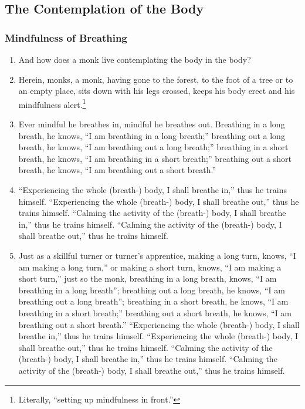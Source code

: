 \subsection*{The Contemplation of the Body}
\subsubsection*{Mindfulness of Breathing}
\begin{enumerate}[resume]
\item And how does a monk live contemplating the body in the body?
\item Herein, monks, a monk, having gone to the forest, to the foot of a tree or to an empty place, sits down with his legs crossed, keeps his body erect and his mindfulness alert.\footnote{Literally, “setting up mindfulness in front.”}
\item Ever mindful he breathes in, mindful he breathes out. Breathing in a long breath, he knows, “I am breathing in a long breath;” breathing out a long breath, he knows, “I am breathing out a long breath;” breathing in a short breath, he knows, “I am breathing in a short breath;” breathing out a short breath, he knows, “I am breathing out a short breath.”
\item “Experiencing the whole (breath-) body, I shall breathe in,” thus he trains himself. “Experiencing the whole (breath-) body, I shall breathe out,” thus he trains himself. “Calming the activity of the (breath-) body, I shall breathe in,” thus he trains himself. “Calming the activity of the (breath-) body, I shall breathe out,” thus he trains himself.
\item Just as a skillful turner or turner's apprentice, making a long turn, knows, ``I am making a long turn,'' or making a short turn, knows, ``I am making a short turn,'' just so the monk, breathing in a long breath, knows, ``I am breathing in a long breath''; breathing out a long breath, he knows, ``I am breathing out a long breath''; breathing in
a short breath, he knows, “I am breathing in a short breath;” breathing out a short breath, he knows, “I am breathing out a short breath.” “Experiencing the whole (breath-) body, I shall breathe in,” thus he trains himself. “Experiencing the whole (breath-) body, I shall breathe out,” thus he trains himself. “Calming the activity of the (breath-) body, I shall breathe in,” thus he trains himself. “Calming the activity of the (breath-) body, I shall breathe out,” thus he trains himself.

\end{enumerate}
